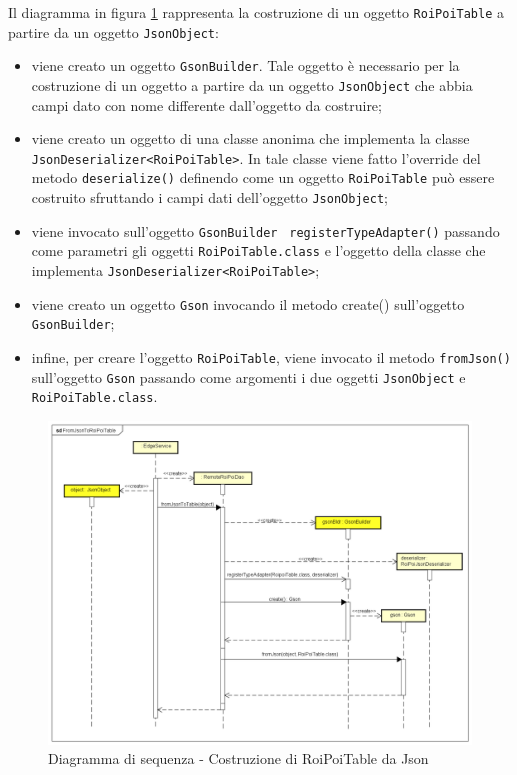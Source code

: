 \documentclass[../DefinizioneDiProdotto.tex]{subfiles}
\begin{document}
		Il diagramma in figura \ref{FromJsonToRoiPoiTable} rappresenta la costruzione di un oggetto \verb|RoiPoiTable| a partire da un oggetto \verb|JsonObject|:
		\begin{itemize}
			\item viene creato un oggetto \verb|GsonBuilder|. Tale oggetto è necessario per la costruzione di un oggetto a partire da un oggetto \verb|JsonObject| che abbia campi dato con nome differente dall'oggetto da costruire;
			\item viene creato un oggetto di una classe anonima che implementa la classe \verb|JsonDeserializer<RoiPoiTable>|. In tale classe viene fatto l'override del metodo \verb|deserialize()| definendo come un oggetto \verb|RoiPoiTable| può essere costruito sfruttando i campi dati dell'oggetto \verb|JsonObject|;
			\item viene invocato sull'oggetto \verb|GsonBuilder | \verb|registerTypeAdapter()| passando come parametri gli oggetti \verb|RoiPoiTable.class| e l'oggetto della classe che implementa \verb|JsonDeserializer<RoiPoiTable>|;
			\item viene creato un oggetto \verb|Gson| invocando il metodo create() sull'oggetto \verb|GsonBuilder|;
			\item infine, per creare l'oggetto \verb|RoiPoiTable|, viene invocato il metodo \verb|fromJson()| sull'oggetto \verb|Gson| passando come argomenti i due oggetti \verb|JsonObject| e \verb|RoiPoiTable.class|.
		\end{itemize}
		\begin{figure} [p]
			\includegraphics[width=\textwidth]{diagrams/FromJsonToRoiPoiTable}
			\caption{Diagramma di sequenza - Costruzione di RoiPoiTable da Json}
			\label{FromJsonToRoiPoiTable}
		\end{figure}
		
\end{document}

